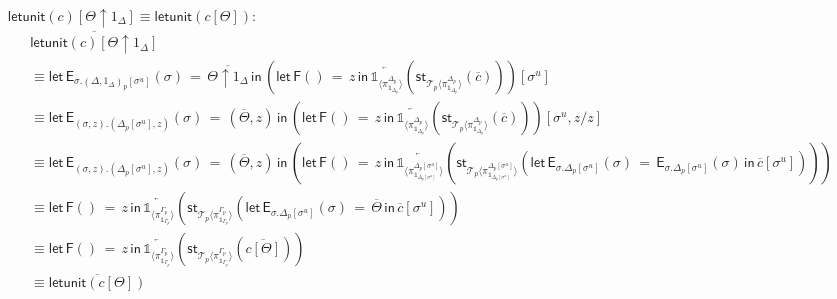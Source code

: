 \documentclass[10pt]{article}
\theoremstyle{definition}
\newcommand{\rewrite}[2]{\overleftarrow{#1}(#2)}
\newcommand\StI[2]{\ensuremath{\mathsf{st}_{#1}(#2)}}
\newcommand\FE[3]{\ensuremath{\mathsf{let} \, \mathsf{F}(#2) \, = \, {#1} \, \mathsf{in} \, #3}}
\newcommand\EEs[4]{\ensuremath{\mathsf{let} \, \mathsf{E}_{#1}(#3) \, = \, {#2} \, \mathsf{in} \, #4}}
\newcommand\EIs[2]{\ensuremath{\mathsf{E}_{#1}{(#2)}}}
\newcommand\ApEl[2]{\mathcal{T}_{#1}\langle#2\rangle}
\newcommand\unp[2]{\ensuremath{{#2}^u}}
\newcommand{\modeof}[1]{{#1}_p}
\newcommand{\upstairs}[1]{\overline{#1}}
\newcommand\One{\ensuremath{\mathds{1}}}
\newcommand\ApOne[1]{\ensuremath{\One_{\langle {#1} \rangle }}}
\newcommand\qunitmatch[1]{\ensuremath{\mathsf{letunit}(#1)}}
\begin{document}
\begin{enumerate}[style = multiline, labelwidth = 80pt]
\item[{$\qunitmatch{c}[\Theta \uparrow 1_\Delta] \equiv \qunitmatch{c[\Theta]}$}:]
\begin{align*}
&\upstairs{\qunitmatch{c}[\Theta \uparrow 1_\Delta]} \\
&\equiv \EEs{\sigma. \modeof{(\Delta, 1_\Delta)}[\unp{\Delta, 1_\Delta}{\sigma}]}{\upstairs{\Theta \uparrow 1_\Delta}}{\sigma}{(\FE{z}{}{\rewrite{\ApOne{\pi^{\modeof{\Delta}}_{\One_{\modeof{\Delta}}}}}{\StI{\ApEl{p}{\pi^{\modeof{\Delta}}_{\One_{\modeof{\Delta}}}}}{\upstairs{c}}}})[\unp{\Delta, 1_\Delta}{\sigma}]} \\
&\equiv \EEs{(\sigma,z).(\modeof{\Delta}[\unp{\Delta}{\sigma}], z)}{(\upstairs{\Theta},z)}{\sigma}{(\FE{z}{}{\rewrite{\ApOne{\pi^{\modeof{\Delta}}_{\One_{\modeof{\Delta}}}}}{\StI{\ApEl{p}{\pi^{\modeof{\Delta}}_{\One_{\modeof{\Delta}}}}}{\upstairs{c}}}})[\unp{\Delta, 1_\Delta}{\sigma},z/z]} \\
&\equiv \EEs{(\sigma,z).(\modeof{\Delta}[\unp{\Delta}{\sigma}], z)}{(\upstairs{\Theta},z)}{\sigma}{(\FE{z}{}{\rewrite{\ApOne{\pi^{\modeof{\Delta}[\unp{\Delta}{\sigma}]}_{\One_{\modeof{\Delta}[\unp{\Delta}{\sigma}]}}}}{\StI{\ApEl{p}{\pi^{\modeof{\Delta}[\unp{\Delta}{\sigma}]}_{\One_{\modeof{\Delta}[\unp{\Delta}{\sigma}]}}}}{\EEs{\sigma. \modeof{\Delta}[\unp{\Delta}{\sigma}]}{\EIs{\sigma.\modeof{\Delta}[\unp{\Delta}{\sigma}]}{\sigma}}{\sigma}{\upstairs{c}[\unp{\Delta}{\sigma}]}}}})} \\
&\equiv \FE{z}{}{\rewrite{\ApOne{\pi^{\modeof{\Gamma}}_{\One_{\modeof{\Gamma}}}}}{\StI{\ApEl{p}{\pi^{\modeof{\Gamma}}_{\One_{\modeof{\Gamma}}}}}{\EEs{\sigma. \modeof{\Delta}[\unp{\Delta}{\sigma}]}{\upstairs{\Theta}}{\sigma}{\upstairs{c}[\unp{\Delta}{\sigma}]}}}} \\
&\equiv \FE{z}{}{\rewrite{\ApOne{\pi^{\modeof{\Gamma}}_{\One_{\modeof{\Gamma}}}}}{\StI{\ApEl{p}{\pi^{\modeof{\Gamma}}_{\One_{\modeof{\Gamma}}}}}{\upstairs{c[\Theta]}}}} \\
&\equiv \upstairs{\qunitmatch{c[\Theta]}}
\end{align*}


\end{enumerate}
\end{document}
